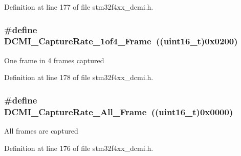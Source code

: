 Definition at line 177 of file stm32f4xx\-\_\-dcmi.\-h.

\hypertarget{group___d_c_m_i___capture___rate_gab1cffa0fc41d2dabe1320370060434f2}{
\subsubsection[{D\-C\-M\-I\-\_\-\-Capture\-Rate\-\_\-1of4\-\_\-\-Frame}]{\setlength{\rightskip}{0pt plus 5cm}\#define D\-C\-M\-I\-\_\-\-Capture\-Rate\-\_\-1of4\-\_\-\-Frame~((uint16\-\_\-t)0x0200)}}\label{group___d_c_m_i___capture___rate_gab1cffa0fc41d2dabe1320370060434f2}
One frame in 4 frames captured 

Definition at line 178 of file stm32f4xx\-\_\-dcmi.\-h.

\hypertarget{group___d_c_m_i___capture___rate_gac6fe1a56c081942ad0398e727280f4b5}{
\subsubsection[{D\-C\-M\-I\-\_\-\-Capture\-Rate\-\_\-\-All\-\_\-\-Frame}]{\setlength{\rightskip}{0pt plus 5cm}\#define D\-C\-M\-I\-\_\-\-Capture\-Rate\-\_\-\-All\-\_\-\-Frame~((uint16\-\_\-t)0x0000)}}\label{group___d_c_m_i___capture___rate_gac6fe1a56c081942ad0398e727280f4b5}
All frames are captured 

Definition at line 176 of file stm32f4xx\-\_\-dcmi.\-h.


